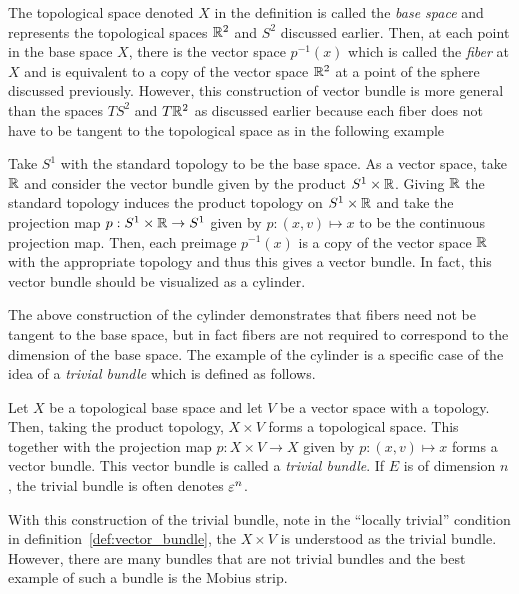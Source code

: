 \documentclass[../sean_thesis.tex]{subfiles}
\begin{document}
The topological space denoted $X$ in the definition is called the \emph{base space} and represents the topological spaces $\mathbb{R}^2$ and $S^2$  discussed earlier. Then, at each point in the base space $X$, there is the vector space $p^{-1}(x)$ which is called the \emph{fiber} at $X$ and is equivalent to a copy of the vector space $\mathbb{R}^2$ at a point of the sphere discussed previously. However, this construction of vector bundle is more general than the spaces $TS^2$ and $T\mathbb{R}^2$ as discussed earlier because each fiber does not have to be tangent to the topological space as in the following example

\begin{example}[Cylinder]
	Take $S^1$ with the standard topology to be the base space. As a vector space, take $\mathbb{R}$ and consider the vector bundle given by the product $S^1 \times \mathbb{R}$. Giving $\mathbb{R}$ the standard topology induces the product topology on $S^1 \times \mathbb{R}$ and take the projection map $p: S^1 \times \mathbb{R} \to S^1$ given by $p: (x,v) \mapsto x$ to be the continuous projection map. Then, each preimage $p^{-1}(x)$ is a copy of the vector space $\mathbb{R}$ with the appropriate topology and thus this gives a vector bundle. In fact, this vector bundle should be visualized as a cylinder.
\end{example}


The above construction of the cylinder demonstrates that fibers need not be tangent to the base space, but in fact fibers are not required to correspond to the dimension of the base space. The example of the cylinder is a specific case of the idea of a \emph{trivial bundle} which is defined as follows.

\begin{definition}
	Let $X$ be a topological base space and let $V$ be a vector space with a topology. Then, taking the product topology, $X \times V$ forms a topological space. This together with the projection map $p: X \times V \to X$ given by $p: (x,v) \mapsto x$ forms a vector bundle. This vector bundle is called a \emph{trivial bundle}. If $E$ is of dimension $n$, the trivial bundle is often denotes $\varepsilon^{n}$.
\end{definition}

With this construction of the trivial bundle, note in the ``locally trivial'' condition in definition~\ref{def:vector_bundle}, the $X \times V$ is understood as the trivial bundle. However, there are many bundles that are not trivial bundles and the best example of such a bundle is the Mobius strip.
\end{document}
